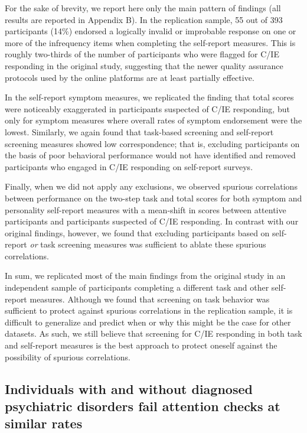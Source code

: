 \documentclass[a4paper,notitlepage,12pt]{article}
\begin{document}
\begin{refsection}[main]
For the sake of brevity, we report here only the main pattern of findings (all results are reported in Appendix B). In the replication sample, 55 out of 393 participants (14\%) endorsed a logically invalid or improbable response on one or more of the infrequency items when completing the self-report measures. This is roughly two-thirds of the number of participants who were flagged for C/IE responding in the original study, suggesting that the newer quality assurance protocols used by the online platforms are at least partially effective. 

In the self-report symptom measures, we replicated the finding that total scores were noticeably exaggerated in participants suspected of C/IE responding, but only for symptom measures where overall rates of symptom endorsement were the lowest. Similarly, we again found that task-based screening and self-report screening measures showed low correspondence; that is, excluding participants on the basis of poor behavioral performance would not have identified and removed participants who engaged in C/IE responding on self-report surveys. 

Finally, when we did not apply any exclusions, we observed spurious correlations between performance on the two-step task and total scores for both symptom and personality self-report measures with a mean-shift in scores between attentive participants and participants suspected of C/IE responding. In contrast with our original findings, however, we found that excluding participants based on self-report \textit{or} task screening measures was sufficient to ablate these spurious correlations. 

In sum, we replicated most of the main findings from the original study in an independent sample of participants completing a different task and other self-report measures. Although we found that screening on task behavior was sufficient to protect against spurious correlations in the replication sample, it is difficult to generalize and predict when or why this might be the case for other datasets. As such, we still believe that screening for C/IE responding in both task and self-report measures is the best approach to protect oneself against the possibility of spurious correlations.

\subsection*{Individuals with and without diagnosed psychiatric disorders fail attention checks at similar rates}


\end{refsection}
\end{document}

